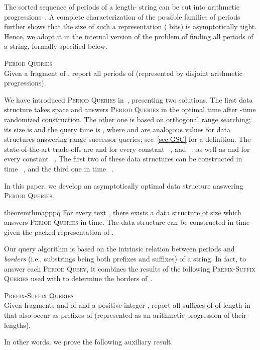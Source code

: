 \documentclass[a4paper]{article}
\theoremstyle{definition}
\theoremstyle{remark}
\newcommand{\PQ}{\textsc{Period Queries}\xspace}
\newcommand{\BQ}{\textsc{Prefix-Suffix Queries}\xspace}
\newenvironment{dsproblem}[1]
{\begin{center}\begin{lrbox}{\mybox}\begin{minipage}{0.96\columnwidth}{\textsc{#1}}\\}
{\end{minipage}\end{lrbox}\fbox{\usebox{\mybox}}\end{center}}
\newcommand{\defdsproblem}[2]{
  \begin{dsproblem}{#1}
#2
  \end{dsproblem}
  }
\begin{document}
The sorted sequence of periods of a length- string can be cut into  arithmetic progressions~\cite{DBLP:journals/siamcomp/KnuthMP77}.
A complete characterization of the possible families of periods~\cite{DBLP:journals/jct/GuibasO81} further shows
that the size of such a representation ( bits) is asymptotically tight.
Hence, we adopt it in the internal version of the problem of finding all periods of a string,
formally specified below.

\defdsproblem{\PQ}{Given a fragment  of , report all periods of  (represented by disjoint arithmetic progressions).}

We have introduced \PQ in~\cite{DBLP:conf/spire/KociumakaRRW12},
presenting two solutions. 
The first data structure takes  space and answers \PQ in the optimal  time
after -time randomized construction.
The other one is based on orthogonal range searching;
its size is  and the query time is ,
where  and 
are analogous values for data structures answering range successor queries; see~\cref{sec:GSC} for a definition.
The state-of-the-art trade-offs are  and  for every constant ~\cite{DBLP:conf/swat/NekrichN12},
 and ~\cite{DBLP:journals/ipl/Zhou16},
as well as  and  for every constant ~\cite{DBLP:journals/tcs/CrochemoreIKRTW12}.
The first two of these data structures can be constructed in time ~\cite{DBLP:conf/soda/BelazzouguiP16,Gao2020},
and the third one in time ~\cite{DBLP:journals/tcs/CrochemoreIKRTW12}.

In this paper, we develop an asymptotically optimal data structure answering \PQ.

\begin{restatable}{theorem}{thmapppq}\label{thm:app-pq}
For every text , there exists a data structure of size  which answers \PQ in  time.
The data structure can be constructed in  time given the packed representation of .
\end{restatable}

Our query algorithm is based on the intrinsic relation between periods and \emph{borders} (i.e., substrings being both prefixes and suffixes) of a string.
In fact, to answer each \textsc{Period Query}, it combines the results of the following \BQ
used with  to determine the borders of~.

\defdsproblem{\BQ}{Given fragments  and  of  and a positive integer , report all suffixes of  of length in 
that also occur as prefixes of  (represented as an arithmetic progression of their lengths).}

In other words, we prove the following auxiliary result.
\end{document}
